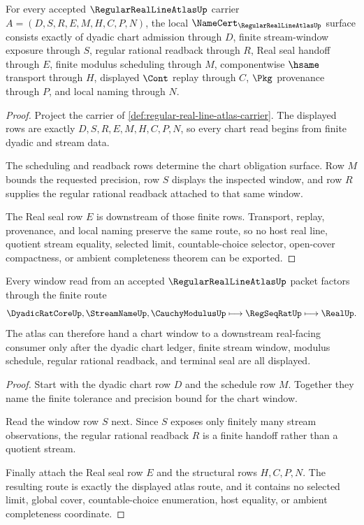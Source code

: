 \begin{theorem}
\label{thm:regular-real-line-atlas-namecert-obligations}
For every accepted $\RegularRealLineAtlasUp$ carrier $A=(D,S,R,E,M,H,C,P,N)$, the local $\NameCert_{\RegularRealLineAtlasUp}$ surface consists exactly of dyadic chart admission through $D$, finite stream-window exposure through $S$, regular rational readback through $R$, Real seal handoff through $E$, finite modulus scheduling through $M$, componentwise $\hsame$ transport through $H$, displayed $\Cont$ replay through $C$, $\Pkg$ provenance through $P$, and local naming through $N$.
\end{theorem}
\begin{proof}
Project the carrier of \autoref{def:regular-real-line-atlas-carrier}. The displayed rows are exactly $D,S,R,E,M,H,C,P,N$, so every chart read begins from finite dyadic and stream data.

The scheduling and readback rows determine the chart obligation surface. Row $M$ bounds the requested precision, row $S$ displays the inspected window, and row $R$ supplies the regular rational readback attached to that same window.

The Real seal row $E$ is downstream of those finite rows. Transport, replay, provenance, and local naming preserve the same route, so no host real line, quotient stream equality, selected limit, countable-choice selector, open-cover compactness, or ambient completeness theorem can be exported.
\end{proof}

\begin{theorem}
\label{thm:regular-real-line-atlas-window-atlas-handoff}
Every window read from an accepted $\RegularRealLineAtlasUp$ packet factors through the finite route
$$
\DyadicRatCoreUp,\StreamNameUp,\CauchyModulusUp
\longmapsto
\RegSeqRatUp
\longmapsto
\RealUp .
$$
The atlas can therefore hand a chart window to a downstream real-facing consumer only after the dyadic chart ledger, finite stream window, modulus schedule, regular rational readback, and terminal seal are all displayed.
\end{theorem}
\begin{proof}
Start with the dyadic chart row $D$ and the schedule row $M$. Together they name the finite tolerance and precision bound for the chart window.

Read the window row $S$ next. Since $S$ exposes only finitely many stream observations, the regular rational readback $R$ is a finite handoff rather than a quotient stream.

Finally attach the Real seal row $E$ and the structural rows $H,C,P,N$. The resulting route is exactly the displayed atlas route, and it contains no selected limit, global cover, countable-choice enumeration, host equality, or ambient completeness coordinate.
\end{proof}

